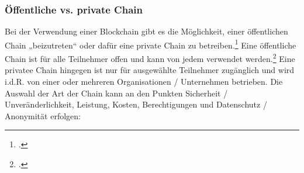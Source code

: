 \noindent

\subsubsection{Öffentliche vs. private Chain}
\label{sec:oeffentlich-vs-privates-netzwerk}


Bei der Verwendung einer Blockchain gibt es die Möglichkeit, einer öffentlichen Chain „beizutreten“ oder dafür eine private Chain zu betreiben.\footcite[Vgl.][]{w10}
Eine öffentliche Chain ist für alle Teilnehmer offen und kann von jedem verwendet werden.\footcite[Vgl. hierzu und zum Folgenden][]{w11}
Eine privatee Chain hingegen ist nur für ausgewählte Teilnehmer zugänglich und wird i.d.R. von einer oder mehreren Organisationen / Unternehmen betrieben.
Die Auswahl der Art der Chain kann an den Punkten Sicherheit / Unveränderlichkeit, Leistung, Kosten, Berechtigungen und Datenschutz / Anonymität erfolgen:
